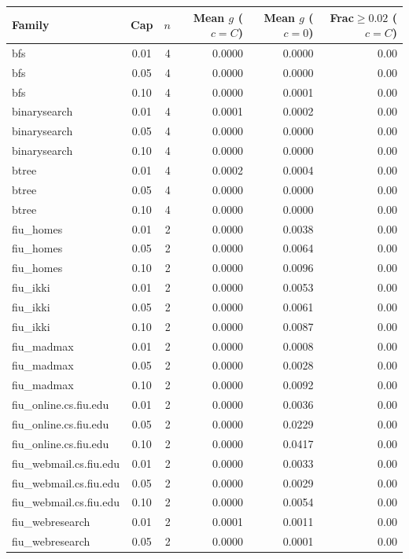 \begin{tabular}{lcrrrr}
\toprule
Family & Cap & $n$ & Mean $g$ ($c=C$) & Mean $g$ ($c=0$) & Frac$\ge 0.02$ ($c=C$) \\
\midrule
bfs & 0.01 & 4 & 0.0000 & 0.0000 & 0.00 \\
bfs & 0.05 & 4 & 0.0000 & 0.0000 & 0.00 \\
bfs & 0.10 & 4 & 0.0000 & 0.0001 & 0.00 \\
binarysearch & 0.01 & 4 & 0.0001 & 0.0002 & 0.00 \\
binarysearch & 0.05 & 4 & 0.0000 & 0.0000 & 0.00 \\
binarysearch & 0.10 & 4 & 0.0000 & 0.0000 & 0.00 \\
btree & 0.01 & 4 & 0.0002 & 0.0004 & 0.00 \\
btree & 0.05 & 4 & 0.0000 & 0.0000 & 0.00 \\
btree & 0.10 & 4 & 0.0000 & 0.0000 & 0.00 \\
fiu\_homes & 0.01 & 2 & 0.0000 & 0.0038 & 0.00 \\
fiu\_homes & 0.05 & 2 & 0.0000 & 0.0064 & 0.00 \\
fiu\_homes & 0.10 & 2 & 0.0000 & 0.0096 & 0.00 \\
fiu\_ikki & 0.01 & 2 & 0.0000 & 0.0053 & 0.00 \\
fiu\_ikki & 0.05 & 2 & 0.0000 & 0.0061 & 0.00 \\
fiu\_ikki & 0.10 & 2 & 0.0000 & 0.0087 & 0.00 \\
fiu\_madmax & 0.01 & 2 & 0.0000 & 0.0008 & 0.00 \\
fiu\_madmax & 0.05 & 2 & 0.0000 & 0.0028 & 0.00 \\
fiu\_madmax & 0.10 & 2 & 0.0000 & 0.0092 & 0.00 \\
fiu\_online.cs.fiu.edu & 0.01 & 2 & 0.0000 & 0.0036 & 0.00 \\
fiu\_online.cs.fiu.edu & 0.05 & 2 & 0.0000 & 0.0229 & 0.00 \\
fiu\_online.cs.fiu.edu & 0.10 & 2 & 0.0000 & 0.0417 & 0.00 \\
fiu\_webmail.cs.fiu.edu & 0.01 & 2 & 0.0000 & 0.0033 & 0.00 \\
fiu\_webmail.cs.fiu.edu & 0.05 & 2 & 0.0000 & 0.0029 & 0.00 \\
fiu\_webmail.cs.fiu.edu & 0.10 & 2 & 0.0000 & 0.0054 & 0.00 \\
fiu\_webresearch & 0.01 & 2 & 0.0001 & 0.0011 & 0.00 \\
fiu\_webresearch & 0.05 & 2 & 0.0000 & 0.0001 & 0.00 \\

\end{tabular}

